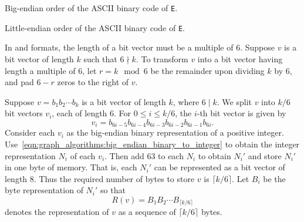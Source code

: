 \begin{table}[!htbp]
\centering

\caption{Big-endian order of the ASCII binary code of \texttt{E}.}
\label{tab:graph_algorithms:big_endian_ASCII_binary_E}
\end{table}

\begin{table}[!htbp]
\centering

\caption{Little-endian order of the ASCII binary code of \texttt{E}.}
\label{tab:graph_algorithms:little_endian_ASCII_binary_E}
\end{table}

In \graphsix\index{\graphsix} and \sparsesix\index{\sparsesix}
formats, the length of a bit vector must be a
multiple of 6. Suppose $v$ is a bit vector of length $k$ such that
$6 \nmid k$. To transform $v$ into a bit vector having length a
multiple of 6, let $r = k \mod 6$ be the remainder
upon dividing $k$ by 6, and pad $6 - r$ zeros to
the right of $v$.

Suppose $v = b_1 b_2 \cdots b_k$ is a bit vector of length $k$, where
$6 \mid k$. We split $v$ into $k/6$ bit vectors $v_i$, each of length
6. For $0 \leq i \leq k/6$, the $i$-th bit vector is given by
\[
v_i
=
b_{6i-5} b_{6i-4} b_{6i-3} b_{6i-2} b_{6i-1} b_{6i}.
\]
Consider each $v_i$ as the big-endian binary
representation of a positive
integer. Use~\eqref{eqn:graph_algorithms:big_endian_binary_to_integer}
to obtain the integer representation $N_i$ of each $v_i$. Then add 63
to each $N_i$ to obtain $N_i'$ and store $N_i'$ in one byte of
memory. That is, each $N_i'$ can be represented as a bit vector of
length $8$. Thus the required number of bytes to store $v$ is
$\lceil k/6 \rceil$. Let $B_i$ be the byte representation of $N_i'$ so
that
\begin{equation}
\label{eqn:graph_algorithms:byte_representation_bit_vector}
R(v)
=
B_1 B_2 \cdots B_{\lceil k/6 \rceil}
\end{equation}
denotes the representation of $v$ as a sequence of $\lceil k/6 \rceil$
bytes.

